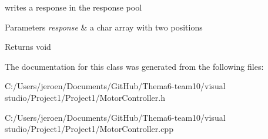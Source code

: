 writes a response in the response pool 


\begin{DoxyParams}{Parameters}
{\em response} & a char array with two positions \\
\hline
\end{DoxyParams}
\begin{DoxyReturn}{Returns}
void 
\end{DoxyReturn}


The documentation for this class was generated from the following files\+:\begin{DoxyCompactItemize}
\item 
C\+:/\+Users/jeroen/\+Documents/\+Git\+Hub/\+Thema6-\/team10/visual studio/\+Project1/\+Project1/Motor\+Controller.\+h\item 
C\+:/\+Users/jeroen/\+Documents/\+Git\+Hub/\+Thema6-\/team10/visual studio/\+Project1/\+Project1/Motor\+Controller.\+cpp\end{DoxyCompactItemize}

